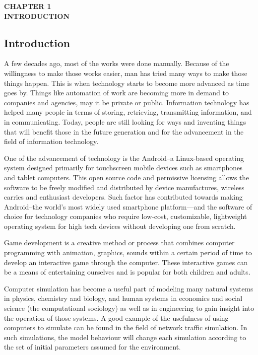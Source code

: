 \clearpage
\thispagestyle{empty}

\begin{center}
	\textbf{{CHAPTER 1}}\\
	\vspace{-1ex}
	\textbf{INTRODUCTION} 
\end{center}
\subsection{Introduction}
\vspace{-3ex}
A few decades ago, most of the works were done manually. Because of the willingness to make those works easier, man has tried many ways to make those things happen. This is when technology starts to become more advanced as time goes by. Things like automation of work are becoming more in demand to companies and agencies, may it be private or public. Information technology has helped many people in terms of storing, retrieving, transmitting information, and in communicating. Today, people are still looking for ways and inventing things that will benefit those in the future generation and for the advancement in the field of information technology.

One of the advancement of technology is the Android--a Linux-based operating system designed primarily for touchscreen mobile devices such as smartphones and tablet computers.  This open source code and permissive licensing allows the software to be freely modified and distributed by device manufactures, wireless carries and enthusiast developers.  Such factor has contributed towards making Android--the world’s most widely used smartphone platform—and the software of choice for technology companies who require low-cost, customizable, lightweight operating system for high tech devices without developing one from scratch.

Game development is a creative method or process that combines computer programming with animation, graphics, sounds within a certain period of time to develop an interactive game through the computer. These interactive games can be a means of entertaining ourselves and is popular for both children and adults.

Computer simulation has become a useful part of modeling many natural systems in physics, chemistry and biology, and human systems in economics and social science (the computational sociology) as well as in engineering to gain insight into the operation of those systems. A good example of the usefulness of using computers to simulate can be found in the field of network traffic simulation. In such simulations, the model behaviour will change each simulation according to the set of initial parameters assumed for the environment.

